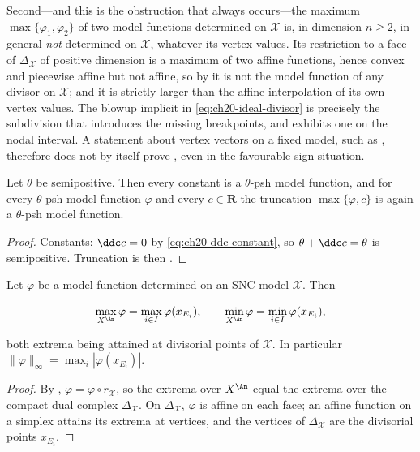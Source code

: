 \begin{example}
Second---and this is the obstruction that always occurs---the maximum
\(\max\{\varphi_1,\varphi_2\}\) of two model functions determined on
\(\mathcal X\) is, in dimension \(n\geq2\), in general \emph{not} determined
on \(\mathcal X\), whatever its vertex values.  Its restriction to a face of
\(\Delta_{\mathcal X}\) of positive dimension is a maximum of two affine
functions, hence convex and piecewise affine but not affine, so by
 it is not the model function of any
divisor on \(\mathcal X\); and it is strictly larger than the affine
interpolation of its own vertex values.  The blowup implicit in
\eqref{eq:ch20-ideal-divisor} is precisely the subdivision that introduces
the missing breakpoints, and  exhibits one on the
nodal interval.  A statement about vertex vectors on a fixed model, such as
, therefore does not by itself prove
, even in the favourable sign situation.
\end{example}

\begin{corollary}
\label{cor:ch20-truncation}
Let \(\theta\) be semipositive.  Then every constant is a \(\theta\)-psh
model function, and for every \(\theta\)-psh model function \(\varphi\) and
every \(c\in\mathbf R\) the truncation \(\max\{\varphi,c\}\) is again a
\(\theta\)-psh model function.
\end{corollary}

\begin{proof}
Constants: \(\ddc c=0\) by \eqref{eq:ch20-ddc-constant}, so
\(\theta+\ddc c=\theta\) is semipositive.  Truncation is then
.
\end{proof}

\begin{proposition}
\label{prop:ch20-maximum-principle}
Let \(\varphi\) be a model function determined on an SNC model
\(\mathcal X\).  Then

\begin{equation}
\label{eq:ch20-maximum-principle}
 \max_{X^{\An}}\varphi=\max_{i\in I}\varphi(x_{E_i}),
 \qquad
 \min_{X^{\An}}\varphi=\min_{i\in I}\varphi(x_{E_i}),
\end{equation}

both extrema being attained at divisorial points of \(\mathcal X\).  In
particular \(\|\varphi\|_\infty=\max_i|\varphi(x_{E_i})|\).
\end{proposition}

\begin{proof}
By , \(\varphi=\varphi\circ r_{\mathcal X}\),
so the extrema over \(X^{\An}\) equal the extrema over the compact dual
complex \(\Delta_{\mathcal X}\).  On \(\Delta_{\mathcal X}\), \(\varphi\) is
affine on each face; an affine function on a simplex attains its extrema at
vertices, and the vertices of \(\Delta_{\mathcal X}\) are the divisorial
points \(x_{E_i}\).
\end{proof}

